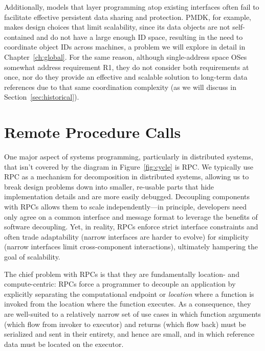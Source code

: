 Additionally, models that layer \NVM programming atop existing interfaces often fail to facilitate effective persistent data sharing and
protection.  PMDK, for example, makes design choices that limit
scalability, since its
data objects are not self-contained and do not have a large enough ID space, resulting
in the need to coordinate object IDs across machines, a problem we will explore in detail in Chapter~\ref{ch:global}. For the same reason,
although single-address space OSes~\cite{chase:tocs94} somewhat address requirement R1, they do
not consider both requirements at once, nor do they provide an effective and scalable solution to
long-term data references due to that same coordination complexity (as we will discuss in Section~\ref{sec:historical}).




\section{Remote Procedure Calls}

One major aspect of systems programming, particularly in distributed systems, that isn't covered by the diagram in
Figure~\ref{fig:cycle} is RPC. We typically use RPC as a mechanism for decomposition in distributed systems, allowing us
to break design problems down into smaller, re-usable parts that hide implementation details and are more easily debugged.
Decoupling components with RPCs allows them to scale
independently---in principle, developers need only agree
on a common interface and message format to leverage the
benefits of software decoupling. Yet, in reality,
RPCs enforce strict interface constraints and often
trade adaptability (narrow interfaces are harder to evolve) for
simplicity (narrow interfaces limit cross-component interactions),
ultimately hampering the goal of scalability.


The chief problem with RPCs is that they are fundamentally location-
and compute-centric: RPCs force a
programmer to decouple an application by explicitly separating the
computational endpoint or \emph{location} where a function is invoked
from the location where the function executes.  As a consequence, they are
well-suited to a relatively narrow set of use cases in which
function arguments (which flow from invoker to executor) and
returns (which flow back) must be serialized and sent in their
entirety, and hence are small, and in which reference data must be
located on the executor.


